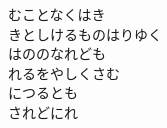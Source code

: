 \documentclass[10pt,b5j]{tarticle} %
\begin{document}
\begin{enumerate}
\begin{minipage}[c]{\blocksize}
        \vspace{\linespace}
        \item
        むことなくはき\\
        きとしけるものはりゆく\\
        はののなれども\\
        れるをやしくさむ\\
        につるとも\\
        されどにれ
    
    \end{minipage}
\end{enumerate} %
\end{document}
